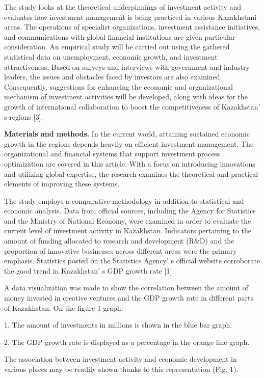 \begin{multicols}{2}
The study looks at the theoretical underpinnings of investment activity
and evaluates how investment management is being practiced in various
Kazakhstani areas. The operations of specialist organizations,
investment assistance initiatives, and communications with global
financial institutions are given particular consideration. An empirical
study will be carried out using the gathered statistical data on
unemployment, economic growth, and investment attractiveness. Based on
surveys and interviews with government and industry leaders, the issues
and obstacles faced by investors are also examined. Consequently,
suggestions for enhancing the economic and organizational mechanism of
investment activities will be developed, along with ideas for the growth
of international collaboration to boost the competitiveness of
Kazakhstan' s regions {[}3{]}.

{\bfseries Materials and methods.} In the current world, attaining
sustained economic growth in the regions depends heavily on efficient
investment management. The organizational and financial systems that
support investment process optimization are covered in this article.
With a focus on introducing innovations and utilizing global expertise,
the research examines the theoretical and practical elements of
improving these systems.

The study employs a comparative methodology in addition to statistical
and economic analysis. Data from official sources, including the Agency
for Statistics and the Ministry of National Economy, were examined in
order to evaluate the current level of investment activity in
Kazakhstan. Indicators pertaining to the amount of funding allocated to
research and development (R\&D) and the proportion of innovative
businesses across different areas were the primary emphasis. Statistics
posted on the Statistics Agency' s official website
corroborate the good trend in Kazakhstan' s GDP growth
rate {[}1{]}.

A data visualization was made to show the correlation between the amount
of money invested in creative ventures and the GDP growth rate in
different parts of Kazakhstan. On the figure 1 graph:

1. The amount of investments in millions is shown in the blue bar graph.

2. The GDP growth rate is displayed as a percentage in the orange line
graph.

The association between investment activity and economic development in
various places may be readily shown thanks to this representation (Fig.
1).
\end{multicols}

